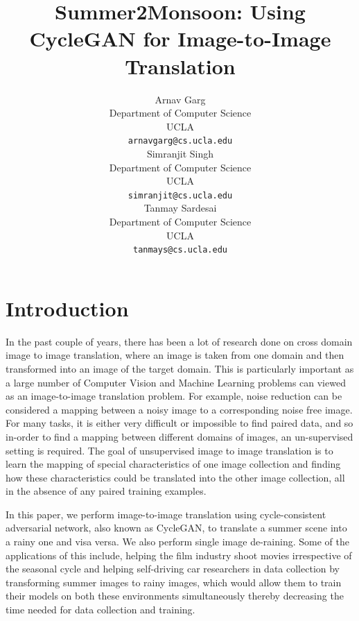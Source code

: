 \documentclass{article}
\title{Summer2Monsoon: Using CycleGAN for Image-to-Image Translation}
\author{
  Arnav Garg \\
  Department of Computer Science\\
  UCLA\\
  \texttt{arnavgarg@cs.ucla.edu} \\
  \And
  Simranjit Singh \\
  Department of Computer Science\\
  UCLA\\
  \texttt{simranjit@cs.ucla.edu} \\
   \And
  Tanmay Sardesai \\
  Department of Computer Science\\
  UCLA\\
  \texttt{tanmays@cs.ucla.edu} \\
}
\begin{document}

\maketitle

\begin{abstract}
 


\end{abstract}

\section{Introduction}

In the past couple of years, there has been a lot of research done on cross domain image to image translation, where an image is taken from one domain and then transformed into an image of the target domain. This is particularly important as a large number of Computer Vision and Machine Learning problems can viewed as an image-to-image translation problem. For example, noise reduction can be considered a mapping between a noisy image to a corresponding noise free image. For many tasks, it is either very difficult or impossible to find paired data, and so in-order to find a mapping between different domains of images, an un-supervised setting is required. The goal of unsupervised image to image translation is to learn the mapping of special characteristics of one image collection and finding how these characteristics could be translated into the other image collection, all in the absence of any paired training examples.

In this paper, we  perform image-to-image translation using cycle-consistent adversarial network, also known as CycleGAN,  to translate a summer scene into a rainy one and visa versa. We also perform single image de-raining. Some of the applications of this include, helping the film industry shoot movies irrespective of the seasonal cycle and helping self-driving car researchers in data collection by transforming summer images to rainy images, which would allow them to train their models on both these environments simultaneously thereby decreasing the time needed for data collection and training.

\end{document}
